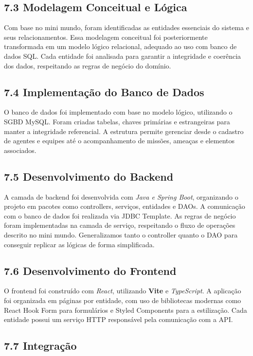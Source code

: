 \documentclass[12pt,a4paper]{report}
\begin{document}
\subsection{7.3 Modelagem Conceitual e Lógica}

Com base no mini mundo, foram identificadas as entidades essenciais do sistema e seus relacionamentos. Essa modelagem conceitual foi posteriormente transformada em um modelo lógico relacional, adequado ao uso com banco de dados SQL. Cada entidade foi analisada para garantir a integridade e coerência dos dados, respeitando as regras de negócio do domínio.

\subsection{7.4 Implementação do Banco de Dados}

O banco de dados foi implementado com base no modelo lógico, utilizando o SGBD MySQL. Foram criadas tabelas, chaves primárias e estrangeiras para manter a integridade referencial. A estrutura permite gerenciar desde o cadastro de agentes e equipes até o acompanhamento de missões, ameaças e elementos associados.

\subsection{7.5 Desenvolvimento do Backend}

A camada de backend foi desenvolvida com \textit{Java e Spring Boot}, organizando o projeto em pacotes como controllers, serviços, entidades e DAOs. A comunicação com o banco de dados foi realizada via JDBC Template. As regras de negócio foram implementadas na camada de serviço, respeitando o fluxo de operações descrito no mini mundo. Generalizamos tanto o controller quanto o DAO para conseguir replicar as lógicas de forma simplificada.

\subsection{7.6 Desenvolvimento do Frontend}

O frontend foi construído com \textit{React}, utilizando \textbf{Vite} e \textit{TypeScript}. A aplicação foi organizada em páginas por entidade, com uso de bibliotecas modernas como React Hook Form para formulários e Styled Components para a estilização. Cada entidade possui um serviço HTTP responsável pela comunicação com a API.

\subsection{7.7 Integração}
\end{document}
